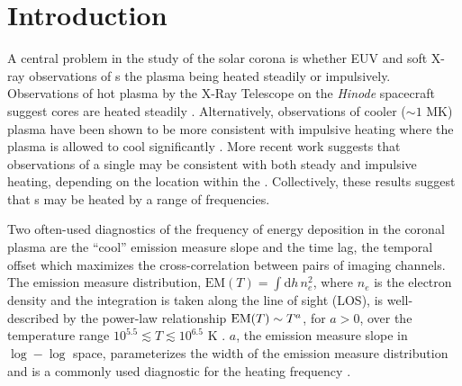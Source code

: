\section{Introduction}\label{sec:introduction}

A central problem in the study of the solar corona is whether EUV and soft X-ray observations of \AR s  the plasma being heated steadily or impulsively.
Observations of hot plasma by the X-Ray Telescope \citep[XRT,][]{golub_x-ray_2007} on the \textit{Hinode} spacecraft \citep{kosugi_hinode_2007} suggest \AR{} cores are heated steadily \citep[e.g.][]{warren_constraints_2011,winebarger_using_2011}.
Alternatively, observations of cooler ($\sim1$ MK) plasma have been shown to be more consistent with impulsive heating where the plasma is allowed to cool significantly  \citep[e.g][]{winebarger_evolving_2003,mulu-moore_determining_2011,ugarte-urra_investigation_2006,viall_patterns_2011,viall_evidence_2012}.
More recent work \citep{del_zanna_evolution_2015,bradshaw_patterns_2016} suggests that observations of a single \AR{} may be consistent with both steady and impulsive heating, depending on the location within the \AR{}.
Collectively, these results suggest that \AR s may be heated by a range of frequencies.

Two often-used diagnostics of the frequency of energy deposition in the coronal plasma are the ``cool'' emission measure slope and the time lag, the temporal offset which maximizes the cross-correlation between pairs of imaging channels.
The emission measure distribution, $\mathrm{EM}(T)=\int\mathrm{d}h\,n_e^2$, where $n_e$ is the electron density and the integration is taken along the line of sight (LOS), is well-described by the power-law relationship $\textup{EM}(T)\sim T^a$, for $a>0$, over the temperature range $10^{5.5}\lesssim T\lesssim10^{6.5}$ K \citep{jordan_structure_1975,jordan_structure_1976}.
$a$, the emission measure slope in $\log-\log$ space, parameterizes the width of the emission measure distribution and is a commonly used diagnostic for the heating frequency \citep[e.g.][]{tripathi_emission_2011,winebarger_using_2011,warren_constraints_2011,mulu-moore_can_2011,bradshaw_diagnosing_2012,schmelz_cold_2012,reep_diagnosing_2013,del_zanna_evolution_2015}.

